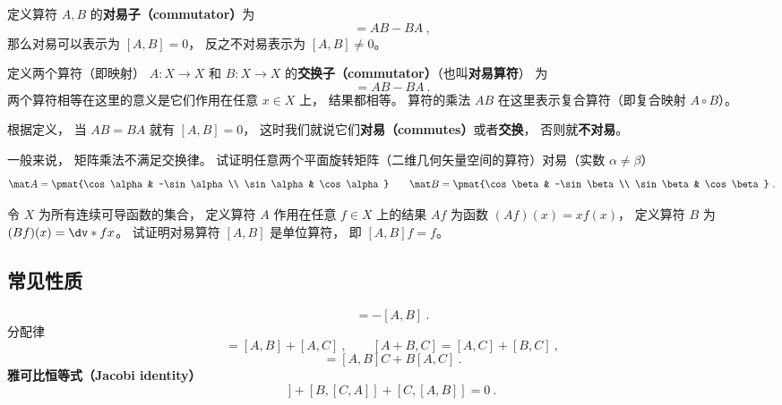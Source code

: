 
定义算符 $A,B$ 的\textbf{对易子（commutator）}为
\begin{equation}
[A, B] = AB - BA~,
\end{equation}
那么对易可以表示为 $[A,B] = 0$， 反之不对易表示为 $[A,B]\ne 0$。



定义两个算符（即映射） $A: X\to X$ 和 $B: X\to X$ 的\textbf{交换子（commutator）}（也叫\textbf{对易算符}） 为
\begin{equation}
[A, B] = A B - B A~.
\end{equation}
两个算符相等在这里的意义是它们作用在任意 $x \in X$ 上， 结果都相等。 算符的乘法 $AB$ 在这里表示复合算符（即复合映射 $A\circ B$）。

根据定义， 当 $A B = B A$ 就有 $[A, B] = 0$， 这时我们就说它们\textbf{对易（commutes）}或者\textbf{交换}， 否则就\textbf{不对易}。

\begin{exercise}{}
一般来说， 矩阵乘法不满足交换律。 试证明任意两个平面旋转矩阵（二维几何矢量空间的算符）对易（实数 $\alpha \ne \beta$）
\begin{equation}
\mat A  = \pmat{\cos\alpha & -\sin\alpha\\ \sin\alpha & \cos\alpha}
\qquad
\mat B  = \pmat{\cos\beta & -\sin\beta\\ \sin\beta & \cos\beta}~.
\end{equation}
\end{exercise}

\begin{exercise}{}
令 $X$ 为所有连续可导函数的集合， 定义算符 $A$ 作用在任意 $f\in X$ 上的结果 $Af$ 为函数 $(Af)(x) = x f(x)$， 定义算符 $B$ 为 $(Bf)(x) = \dv*{f}{x}$。 试证明对易算符 $[A, B]$ 是单位算符， 即 $[A, B]f = f$。
\end{exercise}

\subsection{常见性质}
\begin{equation}
[B, A] = -[A, B]~.
\end{equation}
分配律
\begin{equation}
[A, B + C] = [A, B] + [A, C]~,
\qquad
[A + B, C] = [A, C] + [B, C]~,
\end{equation}
\begin{equation}
[A, BC] = [A, B]C + B[A, C]~.
\end{equation}
\textbf{雅可比恒等式（Jacobi identity）}
\begin{equation}
[A, [B, C]] + [B, [C, A]] + [C, [A, B]] = 0~.
\end{equation}
